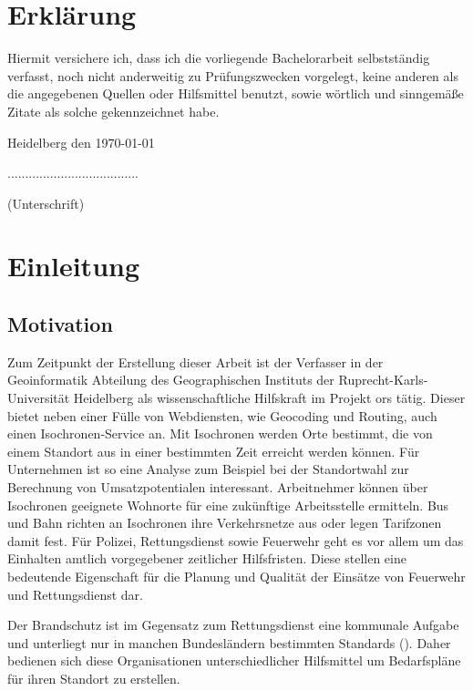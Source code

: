 \documentclass[12pt,a4paper]{article}
\begin{document}
\newpage
\section*{Erklärung}
\vspace{1cm}
Hiermit versichere ich, dass ich die vorliegende Bachelorarbeit selbstständig verfasst, noch nicht anderweitig zu Prüfungszwecken vorgelegt, keine anderen als die angegebenen Quellen oder Hilfsmittel benutzt, sowie wörtlich und sinngemäße Zitate als solche gekennzeichnet habe.\par
\bigskip

{\flushleft Heidelberg den \today } {\hfill .....................................\par}
{\hfill (Unterschrift)}

\newpage
\tableofcontents

\newpage
\listoffigures

\printglossary[type=\acronymtype, title=Abkürzungsverzeichnis, toctitle=Abkürzungsverzeichnis]

\newpage
\section{Einleitung}

\subsection{Motivation}
Zum Zeitpunkt der Erstellung dieser Arbeit ist der Verfasser in der Geoinformatik Abteilung des Geographischen Instituts der Ruprecht-Karls-Universität Heidelberg als wissenschaftliche Hilfskraft im Projekt \gls{ors} tätig. Dieser bietet neben einer Fülle von Webdiensten, wie Geocoding und Routing, auch einen Isochronen-Service an. Mit Isochronen werden Orte bestimmt, die von einem Standort aus in einer bestimmten Zeit erreicht werden können. Für Unternehmen ist so eine Analyse zum Beispiel bei der Standortwahl zur Berechnung von Umsatzpotentialen interessant. Arbeitnehmer können über Isochronen geeignete Wohnorte für eine zukünftige Arbeitsstelle ermitteln. Bus und Bahn richten an Isochronen ihre Verkehrsnetze aus oder legen Tarifzonen damit fest.
Für Polizei, Rettungsdienst sowie Feuerwehr geht es vor allem um das Einhalten amtlich vorgegebener zeitlicher Hilfsfristen. Diese stellen eine bedeutende Eigenschaft für die Planung und Qualität der Einsätze von Feuerwehr und Rettungsdienst dar.\par
Der Brandschutz ist im Gegensatz zum Rettungsdienst eine kommunale Aufgabe und unterliegt nur in manchen Bundesländern bestimmten Standards (\cite{bedarfsplan}). Daher bedienen sich diese Organisationen unterschiedlicher Hilfsmittel um Bedarfspläne für ihren Standort zu erstellen.
\medskip
\end{document}
